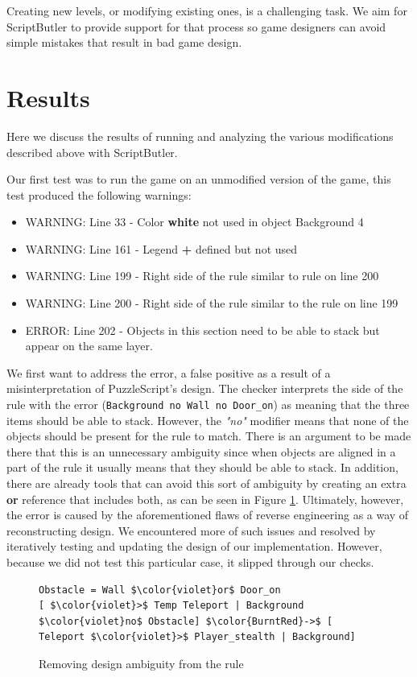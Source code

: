 Creating new levels, or modifying existing ones, is a challenging task. We aim for ScriptButler to provide support for that process so game designers can avoid simple mistakes that result in bad game design. 

\section{Results}
Here we discuss the results of running and analyzing the various modifications described above with ScriptButler.

Our first test was to run the game on an unmodified version of the game, this test produced the following warnings:
\begin{itemize}
    \item WARNING: Line 33 - Color \textbf{white} not used in object Background 4
    \item WARNING: Line 161 - Legend \textbf{ + } defined but not used
    \item WARNING: Line 199 - Right side of the rule similar to rule on line 200
    \item WARNING: Line 200 - Right side of the rule similar to the rule on line 199
    \item ERROR: Line 202 - Objects in this section need to be able to stack but appear on the same layer.
\end{itemize}

We first want to address the error, a false positive as a result of a misinterpretation of PuzzleScript's design. The checker interprets the side of the rule with the error (\texttt{Background no Wall no Door\_on}) as meaning that the three items should be able to stack. However, the \emph{"no"} modifier means that none of the objects should be present for the rule to match. There is an argument to be made there that this is an unnecessary ambiguity since when objects are aligned in a part of the rule it usually means that they should be able to stack. In addition, there are already tools that can avoid this sort of ambiguity by creating an extra \textbf{or} reference that includes both, as can be seen in Figure \ref{fig:case_ambiguity}. Ultimately, however, the error is caused by the aforementioned flaws of reverse engineering as a way of reconstructing design. We encountered more of such issues and resolved by iteratively testing and updating the design of our implementation. However, because we did not test this particular case, it slipped through our checks.

\begin{figure}[!t]
\begin{lstlisting}[language=PuzzleScript]
Obstacle = Wall $\color{violet}or$ Door_on
[ $\color{violet}>$ Temp Teleport | Background $\color{violet}no$ Obstacle] $\color{BurntRed}->$ [ Teleport $\color{violet}>$ Player_stealth | Background]
\end{lstlisting}
\vspace*{-8pt}
\caption{Removing design ambiguity from the rule}
\label{fig:case_ambiguity}
\vspace*{-8pt}
\end{figure}

